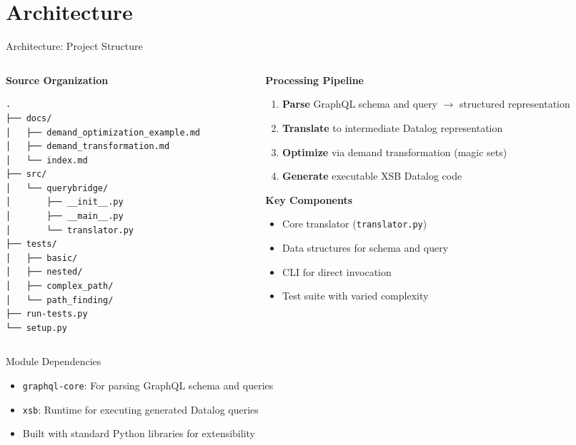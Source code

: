 \documentclass{beamer}
\begin{document}
\section{Architecture}
\begin{frame}[fragile]{Architecture: Project Structure}
  \begin{columns}[T]
    \begin{column}{0.48\textwidth}
      \textbf{Source Organization}
      \begin{lstlisting}[basicstyle=\tiny\ttfamily]
.
├── docs/
│   ├── demand_optimization_example.md
│   ├── demand_transformation.md
│   └── index.md
├── src/
│   └── querybridge/
│       ├── __init__.py
│       ├── __main__.py
│       └── translator.py
├── tests/
│   ├── basic/
│   ├── nested/
│   ├── complex_path/
│   └── path_finding/
├── run-tests.py
└── setup.py
      \end{lstlisting}
    \end{column}
    \begin{column}{0.48\textwidth}
      \textbf{Processing Pipeline}
      \begin{enumerate}
        \item \textbf{Parse} GraphQL schema and query $\rightarrow$ structured representation
        \item \textbf{Translate} to intermediate Datalog representation 
        \item \textbf{Optimize} via demand transformation (magic sets)
        \item \textbf{Generate} executable XSB Datalog code
      \end{enumerate}
      
      \textbf{Key Components}
      \begin{itemize}
        \item Core translator (\texttt{translator.py})
        \item Data structures for schema and query
        \item CLI for direct invocation
        \item Test suite with varied complexity
      \end{itemize}
    \end{column}
  \end{columns}
  
  \begin{block}{Module Dependencies}
    \begin{itemize}
      \item \texttt{graphql-core}: For parsing GraphQL schema and queries
      \item \texttt{xsb}: Runtime for executing generated Datalog queries
      \item Built with standard Python libraries for extensibility
    \end{itemize}
  \end{block}
\end{frame}
\end{document}

